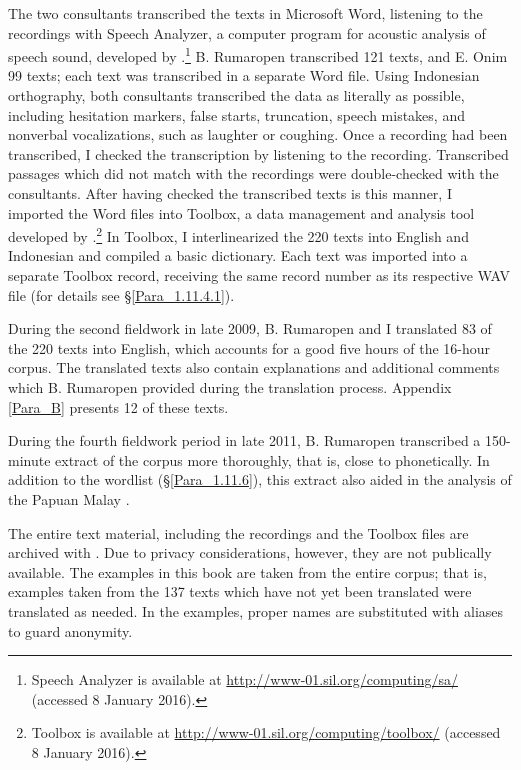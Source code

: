{ 
The two consultants transcribed the texts in Microsoft Word, listening to the recordings with Speech Analyzer, a computer program for acoustic analysis of speech sound, developed by .\footnote{Speech Analyzer is available at \url{http://www-01.sil.org/computing/sa/} (accessed 8 January 2016).} B. Rumaropen transcribed 121 texts, and E. Onim 99 texts; each text was transcribed in a separate Word file. Using Indonesian orthography, both consultants transcribed the data as literally as possible, including hesitation markers, false starts, truncation, speech mistakes, and nonverbal vocalizations, such as laughter or coughing. Once a recording had been transcribed, I checked the transcription by listening to the recording. Transcribed passages which did not match with the recordings were double-checked with the consultants. After having checked the transcribed texts is this manner, I imported the Word files into Toolbox, a data management and analysis tool developed by .\footnote{Toolbox is available at \url{http://www-01.sil.org/computing/toolbox/} (accessed 8 January 2016).} In Toolbox, I interlinearized the 220 texts into English and Indonesian and compiled a basic dictionary. Each text was imported into a separate Toolbox record, receiving the same record number as its respective WAV file (for details see §\ref{Para_1.11.4.1}).



During the second fieldwork in late 2009, B. Rumaropen and I translated 83 of the 220 texts into English, which accounts for a good five hours of the 16-hour corpus. The translated texts also contain explanations and additional comments which B. Rumaropen provided during the translation process. Appendix \ref{Para_B} presents 12 of these texts.



During the fourth fieldwork period in late 2011, B. Rumaropen transcribed a 150-min\-ute extract of the corpus more thoroughly, that is, close to phonetically. In addition to the wordlist (§\ref{Para_1.11.6}), this extract also aided in the analysis of the Papuan Malay .



The entire text material, including the recordings and the Toolbox files are archived with . Due to privacy considerations, however, they are not publically available. The examples in this book are taken from the entire corpus; that is, examples taken from the 137 texts which have not yet been translated were translated as needed. In the examples, proper names are substituted with aliases to guard anonymity.


}
